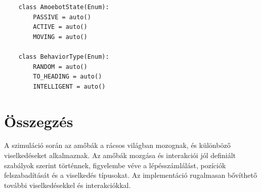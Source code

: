 \documentclass[	
  noindent
]{elteikthesis}[2024/04/26]
\begin{document}
    \begin{verbatim}
    class AmoebotState(Enum):
        PASSIVE = auto()
        ACTIVE = auto()
        MOVING = auto()
    
    class BehaviorType(Enum):
        RANDOM = auto()
        TO_HEADING = auto()
        INTELLIGENT = auto()
    \end{verbatim}
    
    \section{Összegzés}
    A szimuláció során az amőbák a rácsos világban mozognak, és különböző viselkedéseket alkalmaznak. Az amőbák mozgása és interakciói jól definiált szabályok szerint történnek, figyelembe véve a lépésszámlálást, pozíciók felszabadítását és a viselkedés típusokat. Az implementáció rugalmasan bővíthető további viselkedésekkel és interakciókkal.
    
\end{document}
